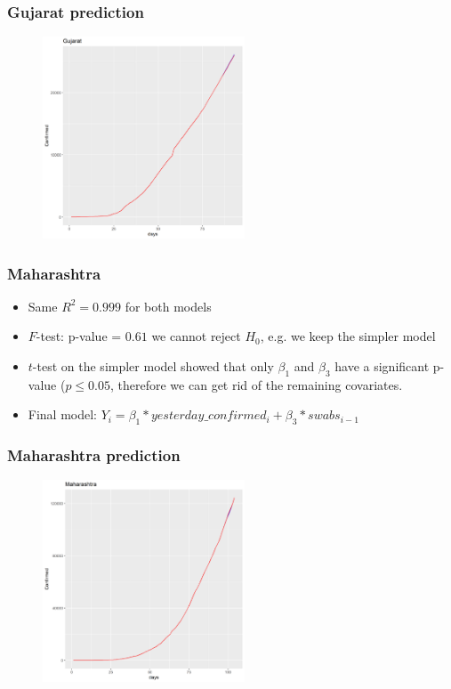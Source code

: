 \documentclass{beamer}
\begin{document}
\begin{frame}
\frametitle{Gujarat prediction}
\begin{figure}
	\includegraphics[width=\linewidth, height=6cm]{../plots/pred/normal/Gujarat_predictions_final.png}
\end{figure}
\end{frame}



\begin{frame}
\frametitle{Maharashtra}
\begin{itemize}
	\item Same $R^2 = 0.999$ for both models
	\item $F$-test: p-value = $0.61$  we cannot reject $H_0$, e.g. we keep the simpler model
	\item $t$-test on the simpler model showed that only $\beta_1$ and $\beta_3$ have a significant p-value ($p\leq 0.05$, therefore we can get rid of the remaining covariates.
	\item Final model: $Y_i = \beta_1*yesterday\_confirmed_i+\beta_3*swabs_{i-1}$
\end{itemize}
\end{frame}

\begin{frame}
\frametitle{Maharashtra prediction}
\begin{figure}
	\includegraphics[width=\linewidth, height=6cm]{../plots/pred/normal/Maharashtra_predictions_final.png}
\end{figure}
\end{frame}
\end{document}
